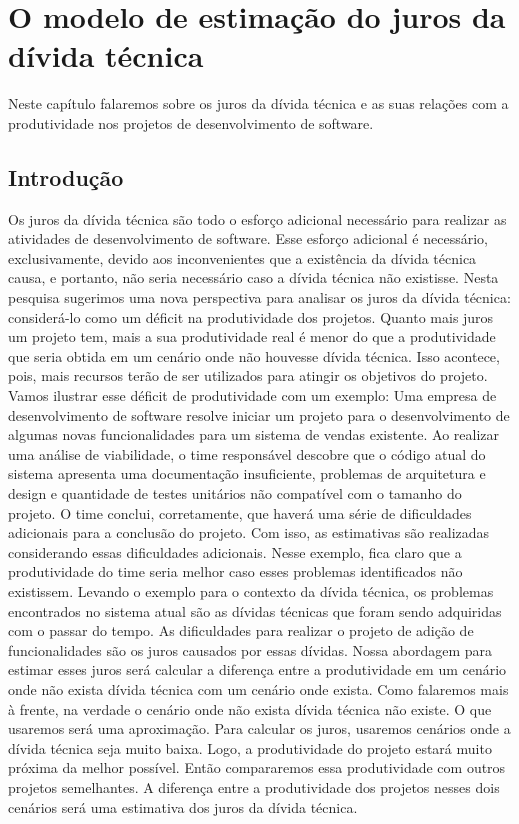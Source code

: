 \chapter{O modelo de estimação do juros da dívida técnica}
\label{estimacao:juros}

Neste capítulo falaremos sobre os juros da dívida técnica e as suas relações com a produtividade nos projetos de desenvolvimento de software.

\section{Introdução}



Os juros da dívida técnica são todo o esforço adicional necessário para realizar as atividades de desenvolvimento de software. Esse esforço adicional é necessário, exclusivamente, devido aos inconvenientes que a existência da dívida técnica causa, e portanto, não seria necessário caso a dívida técnica não existisse. Nesta pesquisa sugerimos uma nova perspectiva para analisar os juros da dívida técnica: considerá-lo como um déficit na produtividade dos projetos. Quanto mais juros um projeto tem, mais a sua produtividade real é menor do que a produtividade que seria obtida em um cenário onde não houvesse dívida técnica. Isso acontece, pois, mais recursos terão de ser utilizados para atingir os objetivos do projeto.  Vamos ilustrar esse déficit de produtividade com um exemplo: Uma empresa de desenvolvimento de software resolve iniciar um projeto para o desenvolvimento de algumas novas funcionalidades para um sistema de vendas existente. Ao realizar uma análise de viabilidade, o time responsável descobre que o código atual do sistema apresenta uma documentação insuficiente, problemas de arquitetura e design e quantidade de testes unitários não compatível com o tamanho do projeto. O time conclui, corretamente, que haverá uma série de dificuldades adicionais para a conclusão do projeto. Com isso, as estimativas são realizadas considerando essas dificuldades adicionais. Nesse exemplo, fica claro que a produtividade do time seria melhor caso esses problemas identificados não existissem. Levando o exemplo para o contexto da dívida técnica, os problemas encontrados no sistema atual são as dívidas técnicas que foram sendo adquiridas com o passar do tempo. As dificuldades para realizar o projeto de adição de funcionalidades são os juros causados por essas dívidas. Nossa abordagem para estimar esses juros será calcular a diferença entre a produtividade em um cenário onde não exista dívida técnica com um cenário onde exista. Como falaremos mais à frente, na verdade o cenário onde não exista dívida técnica não existe. O que usaremos será uma aproximação. Para calcular os juros, usaremos cenários onde a dívida técnica seja muito baixa. Logo, a produtividade do projeto estará muito próxima da melhor possível. Então compararemos essa produtividade com outros projetos semelhantes. A diferença entre a produtividade dos projetos nesses dois cenários será uma estimativa dos juros da dívida técnica.


